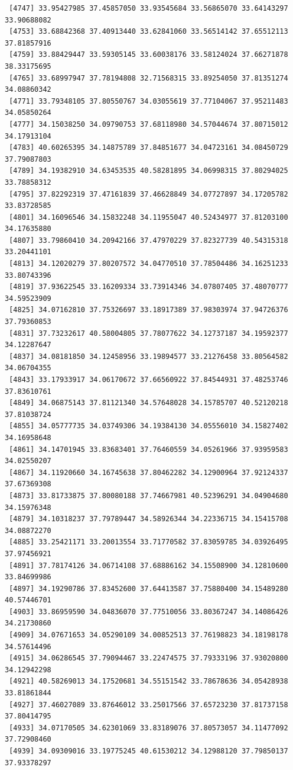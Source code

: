 \documentclass[
  letterpaper,
  DIV=11,
  numbers=noendperiod]{scrartcl}
\begin{document}
\begin{verbatim}
 [4747] 33.95427985 37.45857050 33.93545684 33.56865070 33.64143297 33.90688082
 [4753] 33.68842368 37.40913440 33.62841060 33.56514142 37.65512113 37.81857916
 [4759] 33.88429447 33.59305145 33.60038176 33.58124024 37.66271878 38.33175695
 [4765] 33.68997947 37.78194808 32.71568315 33.89254050 37.81351274 34.08860342
 [4771] 33.79348105 37.80550767 34.03055619 37.77104067 37.95211483 34.05850264
 [4777] 34.15038250 34.09790753 37.68118980 34.57044674 37.80715012 34.17913104
 [4783] 40.60265395 34.14875789 37.84851677 34.04723161 34.08450729 37.79087803
 [4789] 34.19382910 34.63453535 40.58281895 34.06998315 37.80294025 33.78858312
 [4795] 37.82292319 37.47161839 37.46628849 34.07727897 34.17205782 33.83728585
 [4801] 34.16096546 34.15832248 34.11955047 40.52434977 37.81203100 34.17635880
 [4807] 33.79860410 34.20942166 37.47970229 37.82327739 40.54315318 33.20441101
 [4813] 34.12020279 37.80207572 34.04770510 37.78504486 34.16251233 33.80743396
 [4819] 37.93622545 33.16209334 33.73914346 34.07807405 37.48070777 34.59523909
 [4825] 34.07162810 37.75326697 33.18917389 37.98303974 37.94726376 37.79360853
 [4831] 37.73232617 40.58004805 37.78077622 34.12737187 34.19592377 34.12287647
 [4837] 34.08181850 34.12458956 33.19894577 33.21276458 33.80564582 34.06704355
 [4843] 33.17933917 34.06170672 37.66560922 37.84544931 37.48253746 37.83610761
 [4849] 34.06875143 37.81121340 34.57648028 34.15785707 40.52120218 37.81038724
 [4855] 34.05777735 34.03749306 34.19384130 34.05556010 34.15827402 34.16958648
 [4861] 34.14701945 33.83683401 37.76460559 34.05261966 37.93959583 34.02550207
 [4867] 34.11920660 34.16745638 37.80462282 34.12900964 37.92124337 37.67369308
 [4873] 33.81733875 37.80080188 37.74667981 40.52396291 34.04904680 34.15976348
 [4879] 34.10318237 37.79789447 34.58926344 34.22336715 34.15415708 34.08872270
 [4885] 33.25421171 33.20013554 33.71770582 37.83059785 34.03926495 37.97456921
 [4891] 37.78174126 34.06714108 37.68886162 34.15508900 34.12810600 33.84699986
 [4897] 34.19290786 37.83452600 37.64413587 37.75880400 34.15489280 40.57446701
 [4903] 33.86959590 34.04836070 37.77510056 33.80367247 34.14086426 34.21730860
 [4909] 34.07671653 34.05290109 34.00852513 37.76198823 34.18198178 34.57614496
 [4915] 34.06286545 37.79094467 33.22474575 37.79333196 37.93020800 34.12942298
 [4921] 40.58269013 34.17520681 34.55151542 33.78678636 34.05428938 33.81861844
 [4927] 37.46027089 33.87646012 33.25017566 37.65723230 37.81737158 37.80414795
 [4933] 34.07170505 34.62301069 33.83189076 37.80573057 34.11477092 37.72908460
 [4939] 34.09309016 33.19775245 40.61530212 34.12988120 37.79850137 37.93378297

\end{verbatim}
\end{document}
